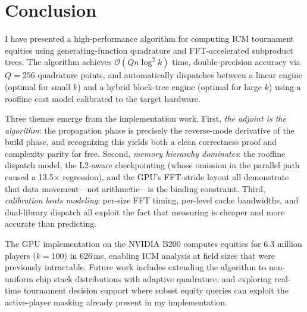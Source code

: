 \documentclass[11pt]{article}
\newcommand{\bigO}{\mathcal{O}}
\begin{document}
\section{Conclusion}\label{sec:conclusion}

I have presented a high-performance algorithm for computing ICM tournament
equities using generating-function quadrature and FFT-accelerated
subproduct trees. The algorithm achieves $\bigO(Qn\log^2 k)$ time,
double-precision accuracy via $Q = 256$ quadrature points, and
automatically dispatches between a linear engine (optimal for small $k$)
and a hybrid block-tree engine (optimal for large $k$) using a roofline
cost model calibrated to the target hardware.

Three themes emerge from the implementation work. First,
\emph{the adjoint is the algorithm}: the propagation phase is precisely
the reverse-mode derivative of the build phase, and recognizing this
yields both a clean correctness proof and complexity parity for free.
Second, \emph{memory hierarchy dominates}: the roofline dispatch model,
the L2-aware checkpointing (whose omission in the parallel path caused
a 13.5$\times$ regression), and the GPU's FFT-stride layout all
demonstrate that data movement---not arithmetic---is the binding
constraint. Third, \emph{calibration beats modeling}: per-size FFT
timing, per-level cache bandwidths, and dual-library dispatch all exploit
the fact that measuring is cheaper and more accurate than predicting.

The GPU implementation on the NVIDIA B200 computes equities for
6.3 million players ($k = 100$) in 626\,ms, enabling ICM analysis at
field sizes that were previously intractable. Future work includes
extending the algorithm to non-uniform chip stack distributions with
adaptive quadrature, and exploring real-time tournament decision support
where subset equity queries can exploit the active-player masking already
present in my implementation.



\end{document}
